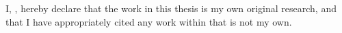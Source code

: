 I, \authorname, hereby declare that the work in this thesis is my own original research, and that I have appropriately cited any work within that is not my own.
